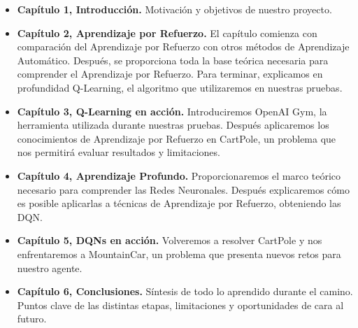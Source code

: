 \begin{itemize}
    \item \textbf{Capítulo 1, Introducción.} Motivación y objetivos de nuestro proyecto.
    \item \textbf{Capítulo 2, Aprendizaje por Refuerzo.} El capítulo comienza con comparación del Aprendizaje por Refuerzo con otros métodos de Aprendizaje Automático. Después, se proporciona toda la base teórica necesaria para comprender el Aprendizaje por Refuerzo. Para terminar, explicamos en profundidad Q-Learning, el algoritmo que utilizaremos en nuestras pruebas.
    \item \textbf{Capítulo 3, Q-Learning en acción.} Introduciremos OpenAI Gym, la herramienta utilizada durante nuestras pruebas. Después aplicaremos los conocimientos de Aprendizaje por Refuerzo en CartPole, un problema que nos permitirá evaluar resultados y limitaciones.
    \item \textbf{Capítulo 4, Aprendizaje Profundo.} Proporcionaremos el marco teórico necesario para comprender las Redes Neuronales. Después explicaremos cómo es posible aplicarlas a técnicas de Aprendizaje por Refuerzo, obteniendo las DQN.
    \item \textbf{Capítulo 5, DQNs en acción.} Volveremos a resolver CartPole y nos enfrentaremos a MountainCar, un problema que presenta nuevos retos para nuestro agente.
    \item \textbf{Capítulo 6, Conclusiones.} Síntesis de todo lo aprendido durante el camino. Puntos clave de las distintas etapas, limitaciones y oportunidades de cara al futuro.
    
\end{itemize}
